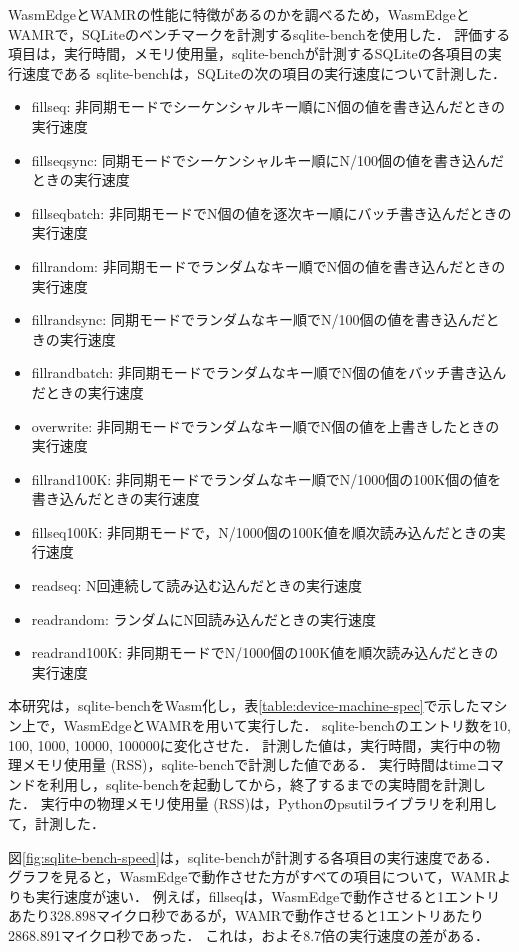 WasmEdgeとWAMRの性能に特徴があるのかを調べるため，WasmEdgeとWAMRで，SQLiteのベンチマークを計測するsqlite-benchを使用した．
評価する項目は，実行時間，メモリ使用量，sqlite-benchが計測するSQLiteの各項目の実行速度である
sqlite-benchは，SQLiteの次の項目の実行速度について計測した．
\begin{itemize}
    \item fillseq: 非同期モードでシーケンシャルキー順にN個の値を書き込んだときの実行速度
    \item fillseqsync: 同期モードでシーケンシャルキー順にN/100個の値を書き込んだときの実行速度
    \item fillseqbatch: 非同期モードでN個の値を逐次キー順にバッチ書き込んだときの実行速度
    \item fillrandom: 非同期モードでランダムなキー順でN個の値を書き込んだときの実行速度
    \item fillrandsync: 同期モードでランダムなキー順でN/100個の値を書き込んだときの実行速度
    \item fillrandbatch: 非同期モードでランダムなキー順でN個の値をバッチ書き込んだときの実行速度
    \item overwrite: 非同期モードでランダムなキー順でN個の値を上書きしたときの実行速度
    \item fillrand100K: 非同期モードでランダムなキー順でN/1000個の100K個の値を書き込んだときの実行速度
    \item fillseq100K: 非同期モードで，N/1000個の100K値を順次読み込んだときの実行速度
    \item readseq: N回連続して読み込む込んだときの実行速度
    \item readrandom: ランダムにN回読み込んだときの実行速度
    \item readrand100K: 非同期モードでN/1000個の100K値を順次読み込んだときの実行速度
\end{itemize}

本研究は，sqlite-benchをWasm化し，表\ref{table:device-machine-spec}で示したマシン上で，WasmEdgeとWAMRを用いて実行した．
sqlite-benchのエントリ数を10, 100, 1000, 10000, 100000に変化させた．
計測した値は，実行時間，実行中の物理メモリ使用量 (RSS)，sqlite-benchで計測した値である．
実行時間はtimeコマンドを利用し，sqlite-benchを起動してから，終了するまでの実時間を計測した．
実行中の物理メモリ使用量 (RSS)は，Pythonのpsutilライブラリを利用して，計測した．


図\ref{fig:sqlite-bench-speed}は，sqlite-benchが計測する各項目の実行速度である．グラフを見ると，WasmEdgeで動作させた方がすべての項目について，WAMRよりも実行速度が速い．
例えば，fillseqは，WasmEdgeで動作させると1エントリあたり328.898マイクロ秒であるが，WAMRで動作させると1エントリあたり2868.891マイクロ秒であった．
これは，およそ8.7倍の実行速度の差がある．

